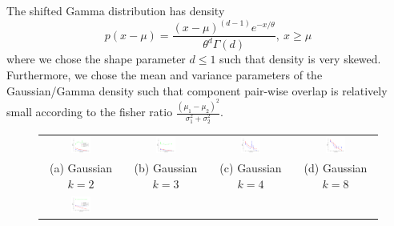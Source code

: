 \documentclass{article}
\begin{document}
The shifted Gamma distribution has density
$$p(x-\mu)=\frac{(x-\mu)^{(d-1)}e^{-x/\theta}}{\theta^d \Gamma(d)},~x\geq \mu$$
where we chose the shape parameter $d\le 1$ such that density is very skewed. Furthermore, we chose the mean and variance parameters of the Gaussian/Gamma density such that component pair-wise overlap is relatively small according to the fisher ratio $\frac{(\mu_1 - \mu_2)^2}{\sigma_1^2+\sigma_2^2}$.

\begin{figure}[!t]
  \hspace{-7mm}
  \renewcommand{\tabcolsep}{1pt}
  \begin{tabular}{cccc}
    \includegraphics[width=0.26\textwidth]{../experiment/figure/sp_diff_gauss_k_2_view_1-crop} &
    \includegraphics[width=0.26\textwidth]{../experiment/figure/sp_diff_gauss_k_3_view_1-crop} &
    \includegraphics[width=0.26\textwidth]{../experiment/figure/sp_diff_gauss_k_4_view_1-crop} &
    \includegraphics[width=0.26\textwidth]{../experiment/figure/sp_diff_gauss_k_8_view_1-crop} \\
    (a) Gaussian $k=2$ & (b) Gaussian $k=3$ & (c) Gaussian $k=4$ & (d) Gaussian $k=8$ \\
    \includegraphics[width=0.26\textwidth]{../experiment/figure/sp_diff_heter_k_2_view_3-crop} &

\end{tabular}
\end{figure}
\end{document}
